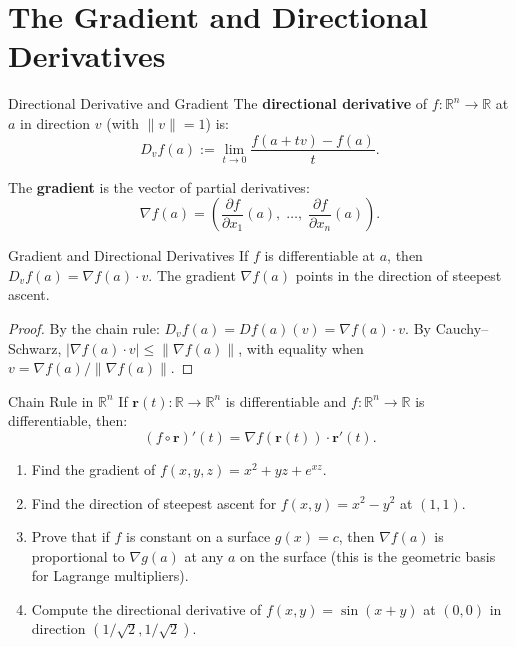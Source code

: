 \documentclass[12pt, openany]{book}
\theoremstyle{plain}
\theoremstyle{definition}
\theoremstyle{remark}
\newcommand{\R}{\mathbb{R}}
\begin{document}
\chapter{The Gradient and Directional Derivatives}
\color{black}

\begin{defbox}{Directional Derivative and Gradient}
The \textbf{directional derivative} of $f : \R^n \to \R$ at $a$ in direction $v$ (with $\|v\| = 1$) is:
\[ D_v f(a) := \lim_{t \to 0} \frac{f(a + tv) - f(a)}{t}. \]

The \textbf{gradient} is the vector of partial derivatives:
\[ \nabla f(a) = \left(\frac{\partial f}{\partial x_1}(a),\; \ldots,\; \frac{\partial f}{\partial x_n}(a)\right). \]
\end{defbox}
\color{black}

\begin{thmbox}{Gradient and Directional Derivatives}
If $f$ is differentiable at $a$, then $D_v f(a) = \nabla f(a) \cdot v$.
The gradient $\nabla f(a)$ points in the direction of steepest ascent.
\end{thmbox}
\color{black}

\begin{proof}
By the chain rule: $D_v f(a) = Df(a)(v) = \nabla f(a) \cdot v$. By Cauchy--Schwarz, $|\nabla f(a) \cdot v| \leq \|\nabla f(a)\|$, with equality when $v = \nabla f(a)/\|\nabla f(a)\|$.
\end{proof}

\begin{thmbox}{Chain Rule in $\R^n$}
If $\mathbf{r}(t) : \R \to \R^n$ is differentiable and $f : \R^n \to \R$ is differentiable, then:
\[ (f \circ \mathbf{r})'(t) = \nabla f(\mathbf{r}(t)) \cdot \mathbf{r}'(t). \]
\end{thmbox}
\color{black}

\begin{exbox}
\begin{enumerate}
  \item Find the gradient of $f(x,y,z) = x^2 + yz + e^{xz}$.
  \item Find the direction of steepest ascent for $f(x,y) = x^2 - y^2$ at $(1,1)$.
  \item Prove that if $f$ is constant on a surface $g(x) = c$, then $\nabla f(a)$ is proportional to $\nabla g(a)$ at any $a$ on the surface (this is the geometric basis for Lagrange multipliers).
  \item Compute the directional derivative of $f(x,y) = \sin(x+y)$ at $(0,0)$ in direction $(1/\sqrt{2}, 1/\sqrt{2})$.
\end{enumerate}
\end{exbox}
\color{black}
\end{document}
